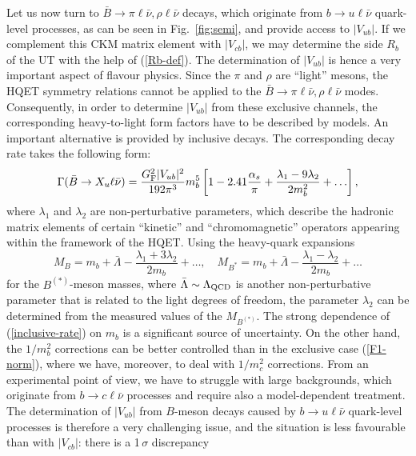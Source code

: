 \documentclass[12pt]{article}
\begin{document}
Let us now turn to $\bar B\to \pi\ell\bar\nu, \rho\ell\bar\nu$ decays, 
which originate from $b\to u\ell \bar\nu$ quark-level processes, as
can be seen in Fig.~\ref{fig:semi}, and provide access to $|V_{ub}|$. 
If we complement this CKM matrix element with $|V_{cb}|$, we may determine 
the side $R_b$ of the UT with the help of (\ref{Rb-def}). The 
determination of $|V_{ub}|$ is hence a very important aspect of
flavour physics. Since the $\pi$ and $\rho$ are ``light'' mesons, 
the HQET symmetry relations 
cannot be applied to the $\bar B\to \pi\ell\bar\nu, \rho\ell\bar\nu$ modes. 
Consequently, in order to determine $|V_{ub}|$ from these exclusive 
channels, the corresponding heavy-to-light form factors have to be
described by models. An important alternative is provided by inclusive 
decays. The corresponding decay rate takes the following form:
\begin{equation}\label{inclusive-rate}
\Gamma(\bar B\to X_u \ell \bar \nu)=
\frac{G_{\rm F}^2|V_{ub}|^2}{192\pi^3}m_b^5
\left[1-2.41\frac{\alpha_s}{\pi}+\frac{\lambda_1-9\lambda_2}{2m_b^2}
+\ldots\right],
\end{equation}
where $\lambda_1$ and $\lambda_2$ are non-perturbative parameters, 
which describe the hadronic matrix elements of certain ``kinetic'' 
and ``chromomagnetic'' operators appearing within the framework of
the HQET. Using the heavy-quark expansions
\begin{equation}\label{mass-exp}
M_B=m_b+\bar\Lambda-\frac{\lambda_1+3\lambda_2}{2m_b}+\ldots, \quad
M_{B^\ast}=m_b+\bar\Lambda-\frac{\lambda_1-\lambda_2}{2m_b}+\ldots
\end{equation}
for the $B^{(\ast)}$-meson masses, where $\bar\Lambda\sim\Lambda_{\rm QCD}$ 
is another non-perturbative parameter that is related to the light degrees
of freedom, the parameter $\lambda_2$ can be determined from the measured
values of the $M_{B^{(\ast)}}$. The strong dependence of 
(\ref{inclusive-rate}) on $m_b$ is a significant
source of uncertainty. On the other hand, the $1/m_b^2$ corrections
can be better controlled than in the exclusive case (\ref{F1-norm}), 
where we have, moreover, to deal with $1/m_c^2$ corrections. From an 
experimental point of view, we have to struggle with large backgrounds, 
which originate from $b\to c \ell \bar\nu$ processes and require also 
a model-dependent treatment. The determination of $|V_{ub}|$ from 
$B$-meson decays caused by $b\to u\ell \bar\nu$ 
quark-level processes is therefore a very challenging issue, and the situation 
is less favourable than with $|V_{cb}|$: there is a 1$\,\sigma$ discrepancy 
\end{document}
